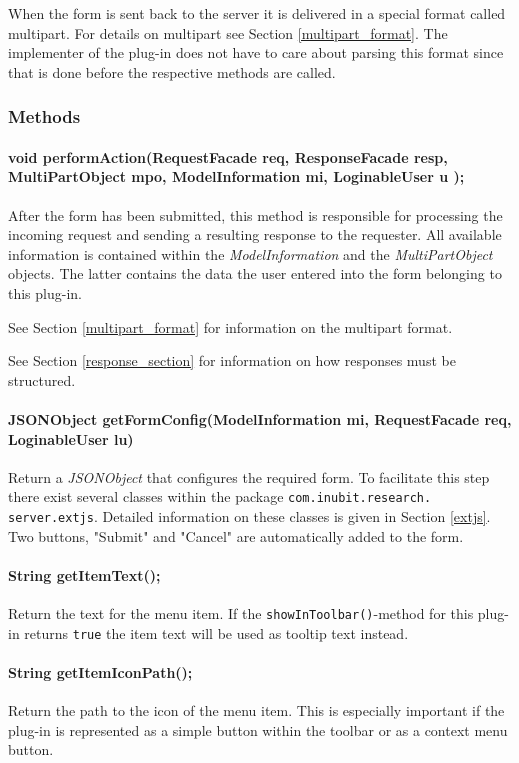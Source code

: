 			When the form is sent back to the server it is delivered
in a special format called multipart. For details on multipart see Section
\ref{multipart_format}. The implementer of the plug-in does not have to care
about parsing this format since that is done before the respective methods are
called.
		
		\subsubsection{Methods}
			\paragraph{void performAction(RequestFacade req,
ResponseFacade resp, MultiPartObject mpo, ModelInformation mi, LoginableUser u
);}
			After the form has been submitted, this method is responsible for processing the incoming
request and sending a resulting response to the requester.
			All available information is contained within the
\textit{ModelInformation} and the \textit{MultiPartObject} objects. The latter
contains the data the user entered into the form belonging to this plug-in. 
			
			See Section \ref{multipart_format} for information on
the multipart format.			
				
			See Section \ref{response_section} for information on
how responses must be structured.
			
			\paragraph{JSONObject getFormConfig(ModelInformation mi, RequestFacade req, LoginableUser lu)}
			Return a \textit{JSONObject} that configures the required form.
To facilitate this step there exist several classes within the package
\verb!com.inubit.research.! \verb!server.extjs!. Detailed information on these classes is
given in Section \ref{extjs}. Two buttons, "Submit" and "Cancel" are
automatically added to the form.
			
			\paragraph{String getItemText();}
			Return the text for the menu item. If the
\verb!showInToolbar()!-method for this plug-in returns \verb!true! the item text
will be used as tooltip text instead.

			\paragraph{String getItemIconPath();}
			Return the path to the icon of the menu item. This is
especially important if the plug-in is represented as a simple button within the
toolbar or as a context menu button.
	
